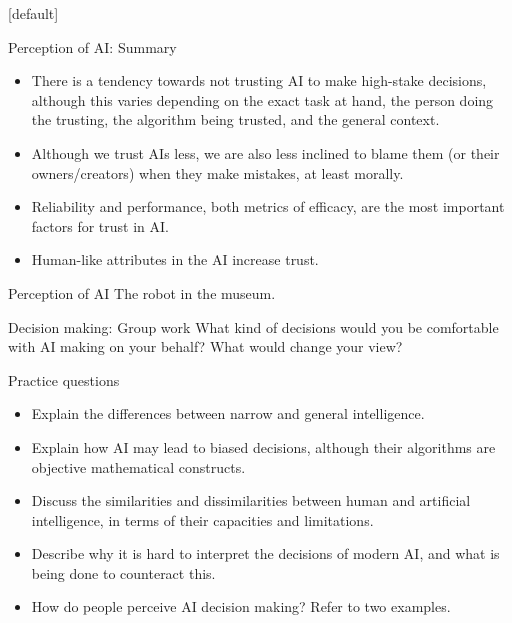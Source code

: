 \documentclass[8pt]{beamer}
\begin{document}
	[default]

	\begin{frame}{Perception of AI: Summary}
		\begin{itemize}
			\item There is a tendency towards not trusting AI to make high-stake decisions, although this varies depending on the exact task at hand, the person doing the trusting, the algorithm being trusted, and the general context.
			\item Although we trust AIs less, we are also less inclined to blame them (or their owners/creators) when they make mistakes, at least morally.
			\item Reliability and performance, both metrics of efficacy, are the most important factors for trust in AI.
			\item Human-like attributes in the AI increase trust.
		\end{itemize}
	\end{frame}

	\begin{frame}{Perception of AI}
		\centering
		The robot in the museum.
	\end{frame}

	\begin{frame}{Decision making: Group work}
		What kind of decisions would you be comfortable with AI making on your behalf? What would change your view?
	\end{frame}

	\begin{frame}{Practice questions}
		\begin{itemize}
			\item Explain the differences between narrow and general intelligence.
			\item Explain how AI may lead to biased decisions, although their algorithms are objective mathematical constructs.
			\item Discuss the similarities and dissimilarities between human and artificial intelligence, in terms of their capacities and limitations.
			\item Describe why it is hard to interpret the decisions of modern AI, and what is being done to counteract this.
			\item How do people perceive AI decision making? Refer to two examples.
		\end{itemize}
	\end{frame}
\end{document}

